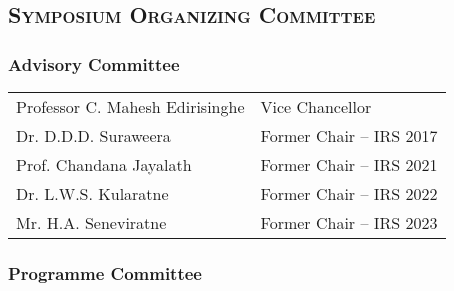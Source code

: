 
\thispagestyle{fancy}
	
	\vspace{-2em} %
	\begin{center}



    \subsection*{\textsc{Symposium Organizing Committee}}
	\end{center}
\vspace{1cm}
\onehalfspacing
\subsubsection*{Advisory Committee}


\begin{longtable}{ p{4.8cm}  p{6.5cm} } 
  
    Professor C. Mahesh Edirisinghe  & Vice Chancellor   \\
    Dr. D.D.D. Suraweera  & Former Chair – IRS 2017 \\
    Prof. Chandana Jayalath & Former Chair – IRS 2021 \\
    Dr. L.W.S. Kularatne & Former Chair – IRS 2022 \\
    Mr. H.A. Seneviratne & Former Chair – IRS 2023 \\
\end{longtable} 

\subsubsection*{Programme Committee}

